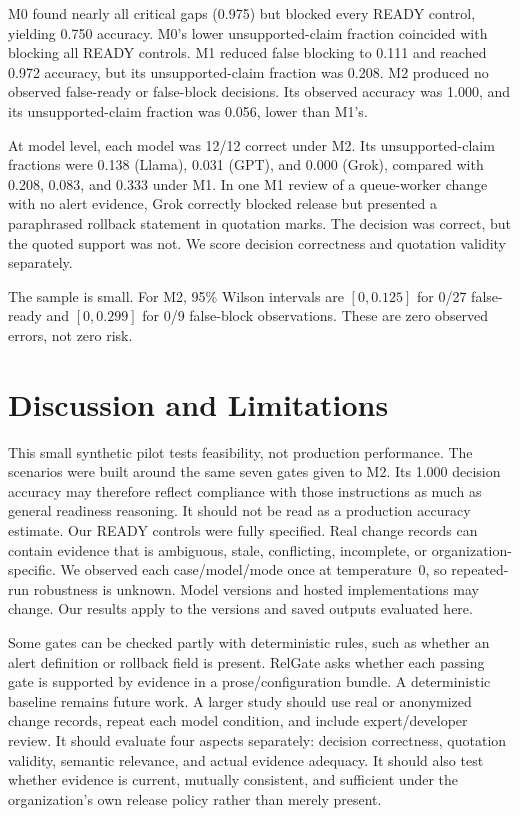 \documentclass[conference]{IEEEtran}
\begin{document}


M0 found nearly all critical gaps (0.975) but blocked every READY control, yielding 0.750 accuracy.
M0's lower unsupported-claim fraction coincided with blocking all READY controls.
M1 reduced false blocking to 0.111 and reached 0.972 accuracy, but its unsupported-claim fraction was 0.208.
M2 produced no observed false-ready or false-block decisions. Its observed accuracy was 1.000, and its unsupported-claim fraction was 0.056, lower than M1's.

At model level, each model was 12/12 correct under M2. Its unsupported-claim fractions were 0.138 (Llama), 0.031 (GPT), and 0.000 (Grok), compared with 0.208, 0.083, and 0.333 under M1.
In one M1 review of a queue-worker change with no alert evidence, Grok correctly blocked release but presented a paraphrased rollback statement in quotation marks.
The decision was correct, but the quoted support was not. We score decision correctness and quotation validity separately.

The sample is small. For M2, 95\% Wilson intervals are $[0,0.125]$ for 0/27 false-ready and $[0,0.299]$ for 0/9 false-block observations.
These are zero observed errors, not zero risk.

\section{Discussion and Limitations}

This small synthetic pilot tests feasibility, not production performance.
\newpage
The scenarios were built around the same seven gates given to M2. Its 1.000 decision accuracy may therefore reflect compliance with those instructions as much as general readiness reasoning. It should not be read as a production accuracy estimate.
Our READY controls were fully specified. Real change records can contain evidence that is ambiguous, stale, conflicting, incomplete, or organization-specific.
We observed each case/model/mode once at temperature~0, so repeated-run robustness is unknown.
Model versions and hosted implementations may change. Our results apply to the versions and saved outputs evaluated here.

Some gates can be checked partly with deterministic rules, such as whether an alert definition or rollback field is present.
RelGate asks whether each passing gate is supported by evidence in a prose/configuration bundle. A deterministic baseline remains future work.
A larger study should use real or anonymized change records, repeat each model condition, and include expert/developer review.
It should evaluate four aspects separately: decision correctness, quotation validity, semantic relevance, and actual evidence adequacy.
It should also test whether evidence is current, mutually consistent, and sufficient under the organization's own release policy rather than merely present.
\end{document}
